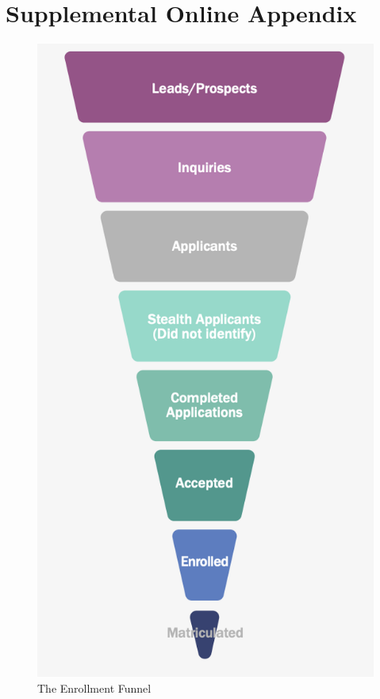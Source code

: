 \documentclass[
  12pt,
]{article}
\author{}
\date{\vspace{-2.5em}}
\newcommand{\beginsupplement}{
\setcounter{table}{0}
\renewcommand{\thetable}{S\arabic{table}}
\setcounter{figure}{0}
\renewcommand{\thefigure}{S\arabic{figure}}}
\begin{document}
\newpage

\hypertarget{supplemental-online-appendix}{%
\section{Supplemental Online Appendix}\label{supplemental-online-appendix}}

\pagestyle{fancy}
\fancyhf{}
\fancyfoot[R]{\thepage}
\setlength{\headheight}{15pt}

\beginsupplement

\begin{figure}

{\centering \includegraphics[width=0.45\linewidth]{./../../outputs/images/enroll_funnelv2} 

}

\caption{The Enrollment Funnel}\label{fig:em-funnel}
\end{figure}
\end{document}
